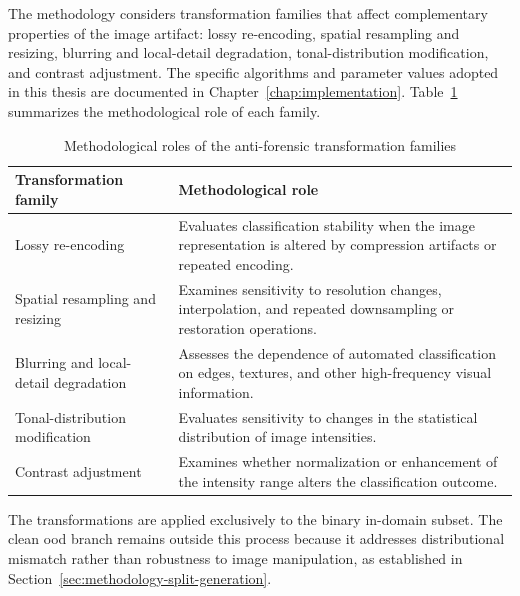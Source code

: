 The methodology considers transformation families that affect complementary
properties of the image artifact: lossy re-encoding, spatial resampling and
resizing, blurring and local-detail degradation, tonal-distribution
modification, and contrast adjustment. The specific algorithms and parameter
values adopted in this thesis are documented in
Chapter~\ref{chap:implementation}.
Table~\ref{tab:methodology-anti-forensic-transformations} summarizes the
methodological role of each family.

\begin{table}[H]
\centering
\caption{Methodological roles of the anti-forensic transformation families}
\label{tab:methodology-anti-forensic-transformations}
\begin{tabularx}{\textwidth}{@{}
>{\raggedright\arraybackslash}p{}
X
@{}}
\toprule
\textbf{Transformation family} &
\textbf{Methodological role} \\
\midrule

Lossy re-encoding
&
Evaluates classification stability when the image representation is altered by
compression artifacts or repeated encoding. \\

Spatial resampling and resizing
&
Examines sensitivity to resolution changes, interpolation, and repeated
downsampling or restoration operations. \\

Blurring and local-detail degradation
&
Assesses the dependence of automated classification on edges, textures, and
other high-frequency visual information. \\

Tonal-distribution modification
&
Evaluates sensitivity to changes in the statistical distribution of image
intensities. \\

Contrast adjustment
&
Examines whether normalization or enhancement of the intensity range alters the
classification outcome. \\

\bottomrule
\end{tabularx}
\end{table}

The transformations are applied exclusively to the binary in-domain subset.
The clean \gls{ood} branch remains outside this process because it addresses
distributional mismatch rather than robustness to image manipulation, as
established in Section~\ref{sec:methodology-split-generation}.

